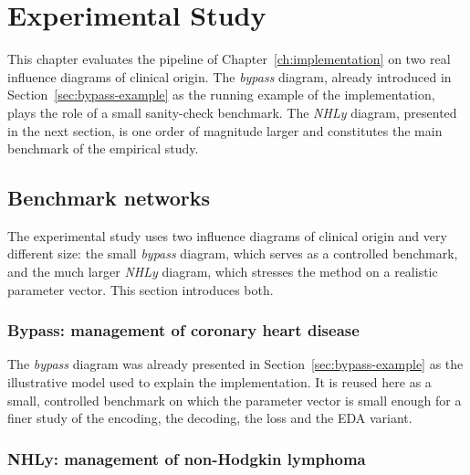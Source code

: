 
\chapter{Experimental Study}
\label{ch:experiments}

This chapter evaluates the pipeline of Chapter~\ref{ch:implementation} on two real influence diagrams of clinical origin. The
\emph{bypass} diagram, already introduced in
Section~\ref{sec:bypass-example} as the running example of the
implementation, plays the role of a small sanity-check benchmark. The
\emph{NHLy} diagram, presented in the next section, is one order of
magnitude larger and constitutes the main benchmark of the empirical study.

\section{Benchmark networks}
\label{sec:benchmarks}

The experimental study uses two influence diagrams of clinical origin and very
different size: the small \emph{bypass} diagram, which serves as a controlled
benchmark, and the much larger \emph{NHLy} diagram, which stresses the method on
a realistic parameter vector. This section introduces both.

\subsection{Bypass: management of coronary heart disease}
\label{sec:bypass-bench}

The \emph{bypass} diagram was already presented in
Section~\ref{sec:bypass-example} as the illustrative model used to
explain the implementation. It is reused here as a small, controlled benchmark on which the parameter vector is small enough for a finer study of the encoding, the decoding, the loss and the EDA variant.


\subsection{NHLy: management of non-Hodgkin lymphoma}
\label{sec:nhlv1}

